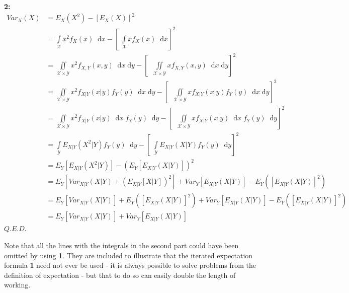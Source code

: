 \documentclass[12pt,a4paper]{article}
\newcommand{\diff}{\;\mathrm{d}}
\begin{document}
{\bf2: }
\begin{align*}
Var_{X}(X) &= E_{{X}}(X^2) - [E_{X}(X)]^2\\
&= \int\limits_{\mathcal{X}}\!\! x^2 f_X(x)\;\diff x - \left[\;\int\limits_{\mathcal{X}}\!\! x f_X(x)\;\diff x\right]^2\\
&= \iint\limits_{\mathcal{X}\times\mathcal{Y}}\!\! x^2 f_{X,Y}(x,y)\;\diff x \diff y - \left[ \;\;\iint\limits_{\mathcal{X}\times\mathcal{Y}}\!\! x f_{X,Y}(x,y)\;\diff x\diff y\right]^2\\
&= \iint\limits_{\mathcal{X}\times\mathcal{Y}}\!\! x^2 f_{X|Y}(x|y) f_Y(y) \;\diff x\diff y - \left[\;\;\iint\limits_{\mathcal{X}\times\mathcal{Y}}\!\! x f_{X|Y}(x|y) f_Y(y) \;\diff x\diff y\right]^2\\
&= \iint\limits_{\mathcal{X}\times\mathcal{Y}}\!\! x^2 f_{X|Y}(x|y) \;\diff x\; f_Y(y)\;\diff y - \left[\;\;\iint\limits_{\mathcal{X}\times\mathcal{Y}}\!\! x f_{X|Y}(x|y)\;\diff x\; f_Y(y)\;\diff y\right]^2\\
&= \int\limits_{\mathcal{Y}}\!\! E_{{X|Y}}(X^2|Y) f_Y(y)\;\diff y - \left[\;\int\limits_{\mathcal{Y}}\!\! E_{{X|Y}}(X|Y) f_Y(y)\;\diff y\right]^2\\
&= E_{Y}[E_{{X|Y}}(X^2|Y)] - (E_{Y}[E_{{X|Y}}(X|Y)])^2\\
&= E_{Y}[Var_{{X|Y}}(X|Y) + (E_{{X|Y}}[X|Y])^2] + Var_{Y}[E_{{X|Y}}(X|Y)] - E_{Y}([E_{{X|Y}}(X|Y)]^2)\\
&= E_{Y}[Var_{{X|Y}}(X|Y)] + E_{Y}([E_{{X|Y}}(X|Y)]^2) + Var_{Y}[E_{{X|Y}}(X|Y)] - E_{Y}([E_{{X|Y}}(X|Y)]^2)\\
&= E_{Y}[Var_{{X|Y}}(X|Y)] + Var_{Y}[E_{{X|Y}}(X|Y)]
\end{align*}\hfill$Q.E.D.$

Note that all the lines with the integrals in the second part could have been omitted by using {\bf 1}. They are included to illustrate that the iterated expectation formula {\bf 1} need not ever be used - it is always possible to solve problems from the definition of expectation - but that to do so can easily double the length of working.
\end{document}
